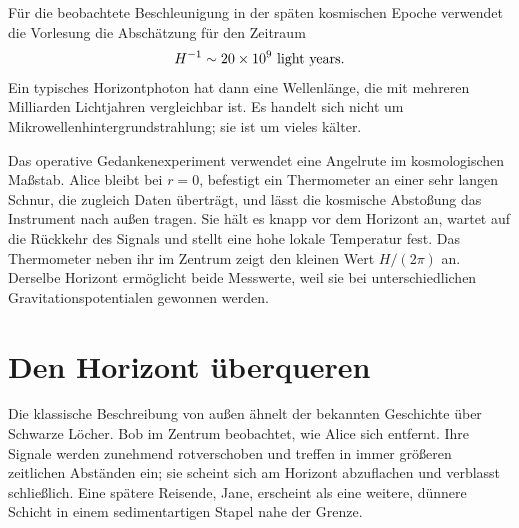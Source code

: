 
Für die beobachtete Beschleunigung in der späten kosmischen Epoche verwendet die Vorlesung die Abschätzung für den Zeitraum
\begin{equation}
H^{-1}\sim 20\times10^9\ {\rm light\ years}.
\label{eq:l09-lecture-horizon-estimate}
\end{equation}
Ein typisches Horizontphoton hat dann eine Wellenlänge, die mit mehreren Milliarden Lichtjahren vergleichbar ist. Es handelt sich nicht um Mikrowellenhintergrundstrahlung; sie ist um vieles kälter.

Das operative Gedankenexperiment verwendet eine Angelrute im kosmologischen Maßstab. Alice bleibt bei \(r=0\), befestigt ein Thermometer an einer sehr langen Schnur, die zugleich Daten überträgt, und lässt die kosmische Abstoßung das Instrument nach außen tragen. Sie hält es knapp vor dem Horizont an, wartet auf die Rückkehr des Signals und stellt eine hohe lokale Temperatur fest. Das Thermometer neben ihr im Zentrum zeigt den kleinen Wert \(H/(2\pi)\) an. Derselbe Horizont ermöglicht beide Messwerte, weil sie bei unterschiedlichen Gravitationspotentialen gewonnen werden.

\section{Den Horizont überqueren}

Die klassische Beschreibung von außen ähnelt der bekannten Geschichte über Schwarze Löcher. Bob im Zentrum beobachtet, wie Alice sich entfernt. Ihre Signale werden zunehmend rotverschoben und treffen in immer größeren zeitlichen Abständen ein; sie scheint sich am Horizont abzuflachen und verblasst schließlich. Eine spätere Reisende, Jane, erscheint als eine weitere, dünnere Schicht in einem sedimentartigen Stapel nahe der Grenze.

\begin{classroomqa}
\end{classroomqa}

